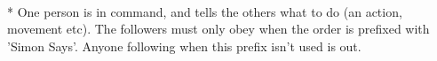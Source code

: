 \begin{minipage}{\textwidth}
\\*
One person is in command, and tells the others what to do (an action, movement etc).  The followers must only obey when the order is prefixed with 'Simon Says'.  Anyone following when this prefix isn't used is out.
\end{minipage}    \vfill
